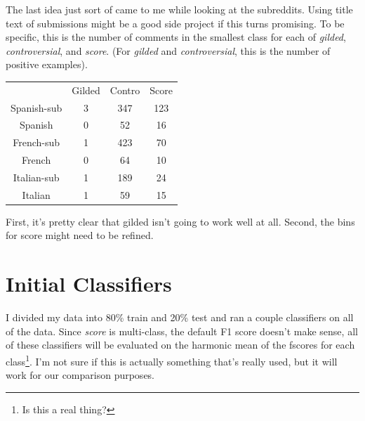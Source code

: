 \documentclass[11pt]{article} %
\begin{document}
The last idea just sort of came to me while looking at the subreddits. Using title text of submissions might be a good side project if this turns promising. To be specific, this is the number of comments in the smallest class for each of \emph{gilded}, \emph{controversial}, and \emph{score}. (For \emph{gilded} and \emph{controversial}, this is the number of positive examples). \\

\begin{tabular}{|c|c|c|c|}
& Gilded&Contro &Score \\
Spanish-sub & 3& 347& 123\\
Spanish & 0& 52& 16\\
French-sub & 1& 423& 70\\
French & 0 & 64& 10\\
Italian-sub & 1& 189& 24\\
Italian & 1& 59& 15\\
\end{tabular}

First, it's pretty clear that gilded isn't going to work well at all. Second, the bins for score might need to be refined.

\section{Initial Classifiers}

I divided my data into 80\% train and 20\% test and ran a couple classifiers on all of the data. Since \emph{score} is multi-class, the default F1 score doesn't make sense, all of these classifiers will be evaluated on the harmonic mean of the fscores for each class\footnote{Is this a real thing?}. I'm not sure if this is actually something that's really used, but it will work for our comparison purposes.
\end{document}
